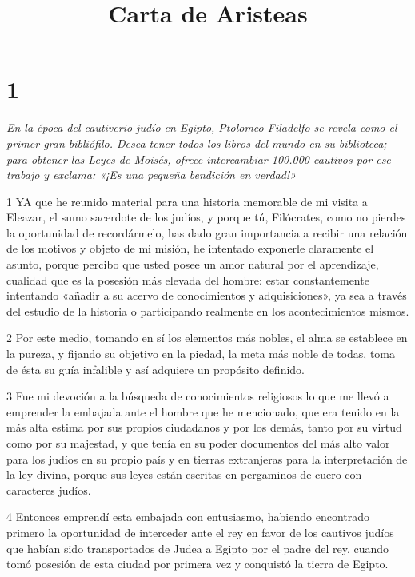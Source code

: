 

\title{Carta de Aristeas}

\chapter{1}

\par \textit{En la época del cautiverio judío en Egipto, Ptolomeo Filadelfo se revela como el primer gran bibliófilo. Desea tener todos los libros del mundo en su biblioteca; para obtener las Leyes de Moisés, ofrece intercambiar 100.000 cautivos por ese trabajo y exclama: «¡Es una pequeña bendición en verdad!»}

\par 1 YA que he reunido material para una historia memorable de mi visita a Eleazar, el sumo sacerdote de los judíos, y porque tú, Filócrates, como no pierdes la oportunidad de recordármelo, has dado gran importancia a recibir una relación de los motivos y objeto de mi misión, he intentado exponerle claramente el asunto, porque percibo que usted posee un amor natural por el aprendizaje, cualidad que es la posesión más elevada del hombre: estar constantemente intentando «añadir a su acervo de conocimientos y adquisiciones», ya sea a través del estudio de la historia o participando realmente en los acontecimientos mismos.

\par 2 Por este medio, tomando en sí los elementos más nobles, el alma se establece en la pureza, y fijando su objetivo en la piedad, la meta más noble de todas, toma de ésta su guía infalible y así adquiere un propósito definido.

\par 3 Fue mi devoción a la búsqueda de conocimientos religiosos lo que me llevó a emprender la embajada ante el hombre que he mencionado, que era tenido en la más alta estima por sus propios ciudadanos y por los demás, tanto por su virtud como por su majestad, y que tenía en su poder documentos del más alto valor para los judíos en su propio país y en tierras extranjeras para la interpretación de la ley divina, porque sus leyes están escritas en pergaminos de cuero con caracteres judíos.

\par 4 Entonces emprendí esta embajada con entusiasmo, habiendo encontrado primero la oportunidad de interceder ante el rey en favor de los cautivos judíos que habían sido transportados de Judea a Egipto por el padre del rey, cuando tomó posesión de esta ciudad por primera vez y conquistó la tierra de Egipto.

